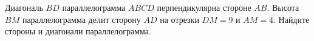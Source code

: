 \begin{ex}
	\begin{condition}
		Диагональ \( BD  \) параллелограмма \( ABCD  \) перпендикулярна стороне \( AB \). Высота \( BM  \) параллелограмма делит сторону \( AD  \) на отрезки \( DM = 9  \) и \( AM = 4 \). Найдите стороны и	диагонали параллелограмма.
	\end{condition}
\end{ex}